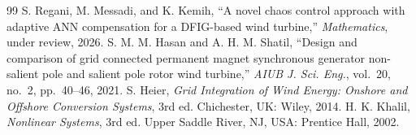 \documentclass[11pt,a4paper]{article}
\begin{document}
\begin{thebibliography}{99}
 S. Regani, M. Messadi, and K. Kemih, ``A novel chaos control approach with
adaptive ANN compensation for a DFIG-based wind turbine,'' \emph{Mathematics}, under review, 2026.
 S. M. M. Hasan and A. H. M. Shatil, ``Design and comparison of grid connected
permanent magnet synchronous generator non-salient pole and salient pole rotor wind turbine,''
\emph{AIUB J. Sci. Eng.}, vol.~20, no.~2, pp.~40--46, 2021.
 S. Heier, \emph{Grid Integration of Wind Energy: Onshore and Offshore Conversion
Systems}, 3rd ed. Chichester, UK: Wiley, 2014.
 H. K. Khalil, \emph{Nonlinear Systems}, 3rd ed. Upper Saddle River, NJ, USA:
Prentice Hall, 2002.
\end{thebibliography}
\end{document}
